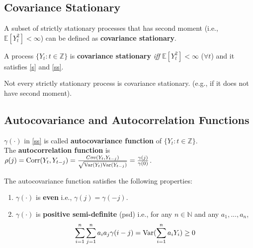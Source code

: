 \documentclass[11pt]{elegantbook}
\begin{document}
\subsection{Covariance Stationary}
A subset of strictly stationary processes that has second moment (i.e., $\mathbb{E}[Y_t^2]<\infty$) can be defined as \textbf{covariance stationary}.
\begin{definition}
    A process $\{Y_t:t\in \mathbb{Z}\}$ is \textbf{covariance stationary} \textit{iff} $\mathbb{E}[Y_t^2]<\infty$ ($\forall t$) and it satisfies \eqref{s} and \eqref{ss}.
\end{definition}
\begin{note}
    Not every strictly stationary process is covariance stationary. (e.g., if it does not have second moment).
\end{note}

\subsection{Autocovariance and Autocorrelation Functions}
\begin{definition}
    $\gamma(\cdot)$ in \eqref{ss} is called \textbf{autocovariance function} of $\{Y_t:t\in \mathbb{Z}\}$.\\
    The \textbf{autocorrelation function} is $\rho(j)=\textnormal{Corr}(Y_t,Y_{t-j})=\frac{Cov(Y_t,Y_{t-j})}{\sqrt{\textnormal{Var}(Y_t)\textnormal{Var}(Y_{t-j})}}=\frac{\gamma(j)}{\gamma(0)}$.
\end{definition}
\begin{lemma}\label{lemma_ACF property}
    The autocovariance function satisfies the following properties:
    \begin{enumerate}
        \item $\gamma(\cdot)$ is \textbf{even} i.e., $\gamma(j)=\gamma(-j)$.
        \item $\gamma(\cdot)$ is \textbf{positive semi-definite} (psd) i.e., for any  $n\in \mathbb{N}$ and any $a_1,...,a_n$,
        \begin{equation}
            \begin{aligned}
                \sum_{i=1}^n\sum_{j=1}^na_ia_j\gamma(i-j)=\textnormal{Var}(\sum_{i=1}^na_iY_i)\geq 0
            \end{aligned}
            \nonumber
        \end{equation}
    \end{enumerate}
\end{lemma}
\end{document}
